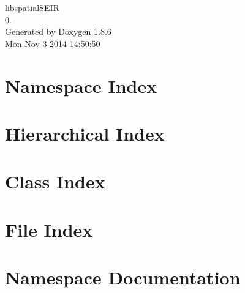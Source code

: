 \documentclass[twoside]{book}
\newcommand{\clearemptydoublepage}{%
  \newpage{\pagestyle{empty}\cleardoublepage}%
}
\begin{document}
\hypersetup{pageanchor=false}
\begin{titlepage}
\vspace*{7cm}
\begin{center}%
{\Large libspatial\-S\-E\-I\-R \\[1ex]\large 0. }\\
\vspace*{1cm}
{\large Generated by Doxygen 1.8.6}\\
\vspace*{0.5cm}
{\small Mon Nov 3 2014 14:50:50}\\
\end{center}
\end{titlepage}
\clearemptydoublepage
\tableofcontents
\clearemptydoublepage
{}
\hypersetup{pageanchor=true}

\chapter{Namespace Index}

\chapter{Hierarchical Index}

\chapter{Class Index}

\chapter{File Index}

\chapter{Namespace Documentation}

\end{document}
